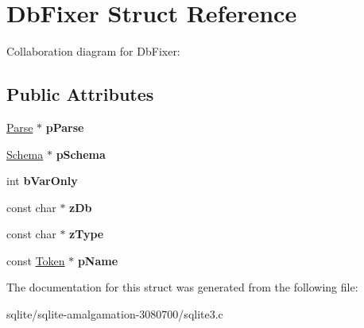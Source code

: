 \hypertarget{struct_db_fixer}{\section{Db\+Fixer Struct Reference}
\label{struct_db_fixer}
}


Collaboration diagram for Db\+Fixer\+:
\subsection*{Public Attributes}
\begin{DoxyCompactItemize}
\item 
\hypertarget{struct_db_fixer_ac5c9b8bca3b05a66faea11dd998bf6f6}{\hyperlink{struct_parse}{Parse} $\ast$ {\bfseries p\+Parse}}\label{struct_db_fixer_ac5c9b8bca3b05a66faea11dd998bf6f6}

\item 
\hypertarget{struct_db_fixer_a302dd5335c8a982deda5bf04bae00363}{\hyperlink{struct_schema}{Schema} $\ast$ {\bfseries p\+Schema}}\label{struct_db_fixer_a302dd5335c8a982deda5bf04bae00363}

\item 
\hypertarget{struct_db_fixer_aebd8549176b84c8c71069ed4d77ad6af}{int {\bfseries b\+Var\+Only}}\label{struct_db_fixer_aebd8549176b84c8c71069ed4d77ad6af}

\item 
\hypertarget{struct_db_fixer_aba91df5965a99915d9180805d02c4a7f}{const char $\ast$ {\bfseries z\+Db}}\label{struct_db_fixer_aba91df5965a99915d9180805d02c4a7f}

\item 
\hypertarget{struct_db_fixer_ae4748d9e97560b7b332527434408c2e8}{const char $\ast$ {\bfseries z\+Type}}\label{struct_db_fixer_ae4748d9e97560b7b332527434408c2e8}

\item 
\hypertarget{struct_db_fixer_aedee20e10de7337651b84656ee81b39c}{const \hyperlink{struct_token}{Token} $\ast$ {\bfseries p\+Name}}\label{struct_db_fixer_aedee20e10de7337651b84656ee81b39c}

\end{DoxyCompactItemize}


The documentation for this struct was generated from the following file\+:\begin{DoxyCompactItemize}
\item 
sqlite/sqlite-\/amalgamation-\/3080700/sqlite3.\+c\end{DoxyCompactItemize}

